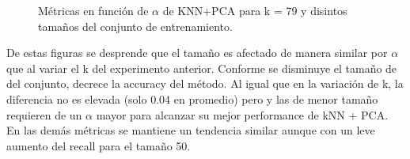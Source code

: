 \begin{figure}[H]
\caption{Métricas en función de $\alpha$ de KNN+PCA para k = 79 y disintos 
tamaños del conjunto de entrenamiento.}
\label{fig:exp5-tam}
\end{figure}

De estas figuras se desprende que el tamaño es afectado de manera similar por $\alpha$ que al variar el k del experimento anterior. Conforme se disminuye el tamaño de del conjunto, decrece la accuracy del método. Al igual que en la variación de k, la diferencia no es elevada (solo 0.04 en promedio) pero y las de menor tamaño requieren de un $\alpha$ mayor para alcanzar su mejor performance de kNN + PCA. \\
En las demás métricas se mantiene un tendencia similar aunque con un leve aumento del recall para el tamaño 50.\\

